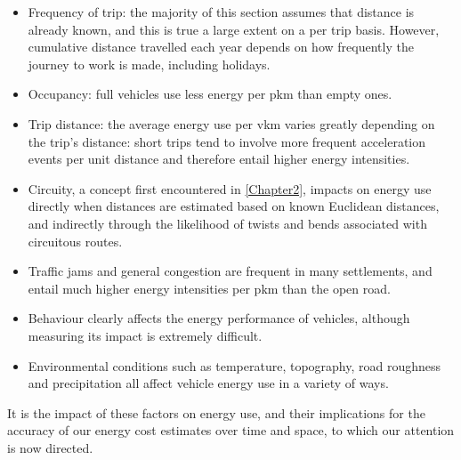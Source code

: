 \begin{itemize}
 \item Frequency of trip: the majority of this section assumes that distance
 is already known, and this is true a large extent on a per trip basis.
 However, cumulative distance travelled each year depends on how frequently
 the journey to work is made, including holidays. 
 \item Occupancy: full vehicles use less energy per pkm than empty ones.
 \item Trip distance: the average energy use per vkm varies greatly depending
 on the trip's distance: short trips tend to involve more frequent acceleration
 events per unit distance and therefore entail higher energy intensities.
 \item Circuity, a concept first encountered in \cref{Chapter2}, impacts on energy
 use directly when distances are estimated based on known Euclidean distances, and
 indirectly through the likelihood of twists and bends associated with circuitous
 routes.
 \item Traffic jams and general congestion are frequent in many settlements, and
 entail much higher energy intensities per pkm than the open road.
 \item Behaviour clearly affects the energy performance of vehicles, although
 measuring its impact is extremely difficult.
 \item Environmental conditions such as temperature, topography, road roughness
 and precipitation all affect vehicle energy use in a variety of ways.
\end{itemize}
It is the impact of these factors on energy use, and their implications
for the accuracy of our energy cost estimates over time and space, to which
our attention is now directed.
% 
% 
% 
% 
% 
% 
% 

